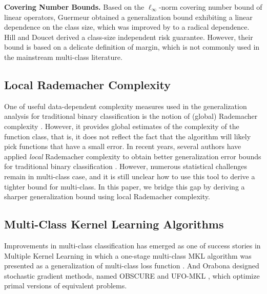 \documentclass{article}
\begin{document}
\textbf{Covering Number  Bounds.}
    Based on the $\ell_\infty$-norm covering number bound of
    linear operators, Guermeur  obtained
    a generalization bound exhibiting a linear dependence on the class size,
    which was improved by \cite{zhang2004statistical} to a radical dependence.
    Hill and Doucet  derived a class-size independent risk guarantee.
    However, their bound is based on a delicate definition of margin,
    which is not commonly used in the mainstream multi-class literature.
\subsection{Local Rademacher Complexity}
One of useful data-dependent complexity measures used in the generalization analysis
for  traditional  binary classification
is the notion of (global) Rademacher complexity \cite{bartlett2003rademacher}.
However,
it provides global estimates of the complexity of the function class,
that is, it does not reflect
the fact that the algorithm will likely pick functions that have a small error.
In recent years,
several authors have applied
 \emph{local} Rademacher complexity to obtain  better generalization error bounds
for traditional binary classification \cite{Bartlett2005lrc,Koltchinskii2006lrcoiirm}.
However,
numerous statistical challenges remain in multi-class case, and it is still unclear how to use
this tool to derive a tighter bound for multi-class.
In this paper,
we bridge this gap by deriving a sharper generalization bound using local Rademacher complexity.
\subsection{Multi-Class Kernel Learning Algorithms}
Improvements in multi-class classification has emerged as one of success stories in Multiple Kernel Learning \cite{ZienO2007}
in which a one-stage multi-class MKL algorithm was presented as a generalization of multi-class loss function \cite{CrammerS02,TsochantaridisHJA04}.
And Orabona designed stochastic gradient methods, named
OBSCURE \cite{OrabonaJC10} and
UFO-MKL \cite{OrabonaL11}, which optimize primal versions of equivalent problems.
\end{document}
